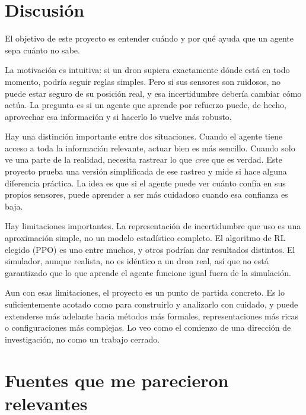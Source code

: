 \documentclass[11pt]{article}
\begin{document}
\section*{Discusión}

El objetivo de este proyecto es entender cuándo y por qué ayuda que un agente sepa cuánto no sabe.

La motivación es intuitiva: si un dron supiera exactamente dónde está en todo momento,
podría seguir reglas simples. Pero si sus sensores son ruidosos,
no puede estar seguro de su posición real, y esa incertidumbre debería cambiar cómo actúa. La pregunta es si un agente que aprende por refuerzo puede, de hecho, aprovechar esa información y si hacerlo lo vuelve más robusto.

Hay una distinción importante entre dos situaciones.
Cuando el agente tiene acceso a toda la información relevante, actuar bien es más sencillo.
Cuando solo ve una parte de la realidad, necesita rastrear lo que \emph{cree} que es verdad.
Este proyecto prueba una versión simplificada de ese rastreo y mide si hace alguna diferencia práctica.
La idea es que si el agente puede ver cuánto confía en sus propios sensores, puede aprender a ser más cuidadoso cuando esa confianza es baja.

Hay limitaciones importantes. La representación de incertidumbre que uso es una aproximación simple,
no un modelo estadístico completo. El algoritmo de RL elegido (PPO) es uno entre muchos,
y otros podrían dar resultados distintos. El simulador, aunque realista, no es idéntico a un dron real,
así que no está garantizado que lo que aprende el agente funcione igual fuera de la simulación.

Aun con esas limitaciones, el proyecto es un punto de partida concreto.
Es lo suficientemente acotado como para construirlo y analizarlo con cuidado,
y puede extenderse más adelante hacia métodos más formales, representaciones más ricas o configuraciones más complejas.
Lo veo como el comienzo de una dirección de investigación, no como un trabajo cerrado.

\newpage

\section*{Fuentes que me parecieron relevantes}
\end{document}
